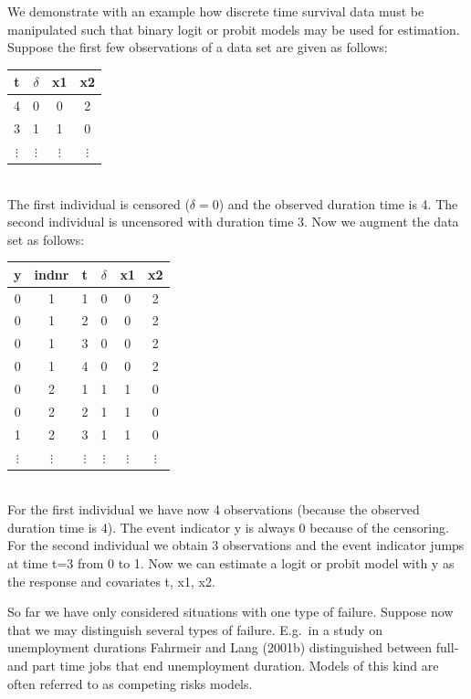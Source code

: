 \documentclass[11pt,a4paper,twoside]{bayesxarticle}
\begin{document}
We demonstrate with an example how discrete time survival data
must be manipulated such that  binary logit or probit models may
be used for estimation. Suppose the first few observations of a
data set are given as follows:
\vspace{0.5cm}\\
\begin{tabular}{c|c|c|c}
t & $\delta$ & x1 & x2\\\hline\hline
 4 & 0& 0 &2\\\hline
 3 & 1 &1 &0\\\hline
 $\vdots$ & $\vdots$ & $\vdots$ & $\vdots$\\
\end{tabular}
\vspace{0.5cm}\\
The first individual is censored ($\delta=0$) and the observed
duration time is 4. The second individual is uncensored with
duration time 3. Now we augment the data set as follows:
\vspace{0.5cm}\\
\begin{tabular}{c|c|c|c|c|c}
y & indnr & t &$\delta$ & x1 & x2\\\hline\hline
0 &  1 &   1 & 0  &    0  & 2\\
0 &  1 &   2 & 0  &    0  & 2\\
0 &  1 &   3&  0  &    0 &  2\\
0 &  1  &  4&  0  &    0 &  2\\\hline
0 &  2  &  1 & 1   &   1 &  0\\
0  & 2  &  2 & 1  &    1  & 0\\
1 &  2 &  3 & 1  &  1  & 0\\\hline
 $\vdots$ & $\vdots$ & $\vdots$ & $\vdots$& $\vdots$& $\vdots$\\
\end{tabular}
\vspace{0.5cm}\\
For the first individual we have now 4 observations (because the
observed duration time is 4). The event indicator y is always 0
because of the censoring. For the second individual we obtain 3
observations and the event indicator jumps at time t=3 from 0 to
1. Now we can estimate a logit or probit model with y as the
response and covariates t, x1, x2.

So far we have only considered situations with one type of
failure. Suppose now that we may distinguish several types of
failure. E.g.~in a study on unemployment durations Fahrmeir and
Lang (2001b) distinguished between full- and part time jobs that
end unemployment duration. Models of this kind are often referred
to as competing risks models.
\end{document}
